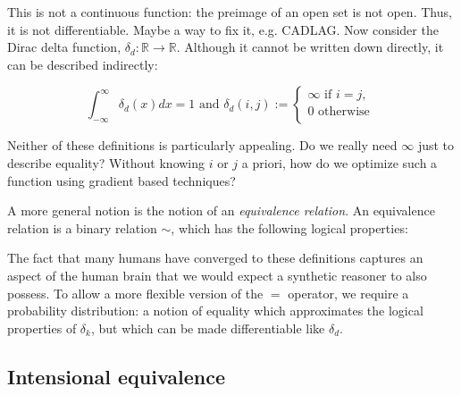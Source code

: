 \documentclass[11pt]{article}
\begin{document}
    This is not a continuous function: the preimage of an open set is not open. Thus, it is not differentiable. Maybe a way to fix it, e.g. CADLAG. Now consider the Dirac delta function, $\delta_d: \mathbb{R} \rightarrow \mathbb{R}$. Although it cannot be written down directly, it can be described indirectly:

    $$
    \int_{-\infty}^{\infty} \delta_d (x)dx = 1 \text{ and } \delta_d(i, j) :=
    \begin{cases}
        \infty \text{ if } i = j, \\
        0 \text{ otherwise }\\
    \end{cases}
    $$

    Neither of these definitions is particularly appealing. Do we really need $\infty$ just to describe equality? Without knowing $i$ or $j$ a priori, how do we optimize such a function using gradient based techniques?


    A more general notion is the notion of an \textit{equivalence relation}. An equivalence relation is a binary relation $\sim$, which has the following logical properties:


    The fact that many humans have converged to these definitions captures an aspect of the human brain that we would expect a synthetic reasoner to also possess. To allow a more flexible version of the $=$ operator, we require a probability distribution: a notion of equality which approximates the logical properties of $\delta_k$, but which can be made differentiable like $\delta_d$.

    \subsection{Intensional equivalence}\label{subsec:intensional-equivalence}
\end{document}

